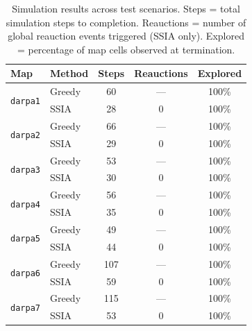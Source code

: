 \documentclass[conference]{IEEEtran}
\begin{document}
\begin{table}[t]
    \centering
    \caption{Simulation results across test scenarios. Steps = total simulation steps to completion. Reauctions = number of global reauction events triggered (SSIA only). Explored = percentage of map cells observed at termination.}
    \label{tab:results}
    \begin{tabular}{@{}llccc@{}}
        \toprule
        \textbf{Map} & \textbf{Method} & \textbf{Steps} & \textbf{Reauctions} & \textbf{Explored} \\
        \midrule
        \multirow{2}{*}{\texttt{darpa1}}
            & Greedy      & 60   & ---  & 100\% \\
            & SSIA        & 28   & 0    & 100\% \\
        \midrule
        \multirow{2}{*}{\texttt{darpa2}}
            & Greedy      & 66   & ---  & 100\% \\
            & SSIA        & 29   & 0    & 100\% \\
        \midrule
        \multirow{2}{*}{\texttt{darpa3}}
            & Greedy      & 53   & ---  & 100\% \\
            & SSIA        & 30   & 0    & 100\% \\
        \midrule
        \multirow{2}{*}{\texttt{darpa4}}
            & Greedy      & 56   & ---  & 100\% \\
            & SSIA        & 35   & 0    & 100\% \\
        \midrule
        \multirow{2}{*}{\texttt{darpa5}}
            & Greedy      & 49   & ---  & 100\% \\
            & SSIA        & 44   & 0    & 100\% \\
        \midrule
        \multirow{2}{*}{\texttt{darpa6}}
            & Greedy      & 107  & ---  & 100\% \\
            & SSIA        & 59   & 0    & 100\% \\
        \midrule
        \multirow{2}{*}{\texttt{darpa7}}
            & Greedy      & 115  & ---  & 100\% \\
            & SSIA        & 53   & 0    & 100\% \\
        \bottomrule
    \end{tabular}
\end{table}
\end{document}

